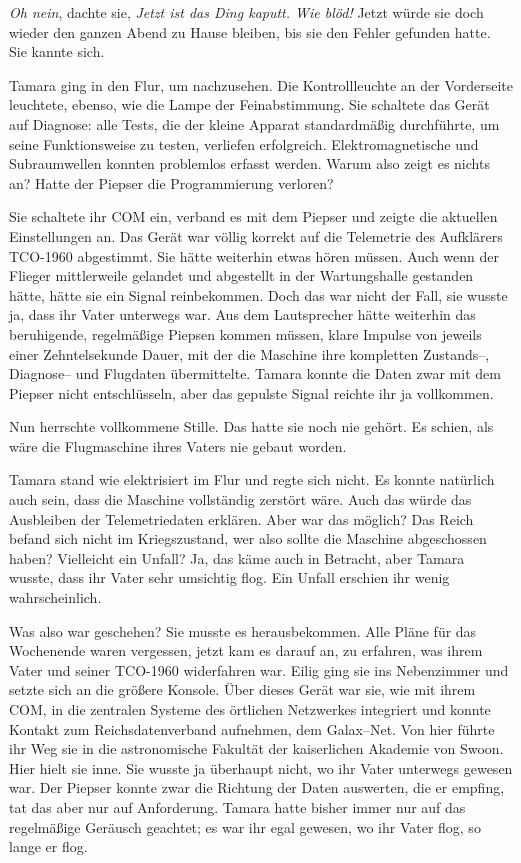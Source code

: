 \documentclass[11pt,twoside,openany]{scrbook}
\begin{document}
\emph{Oh nein}, dachte sie, \emph{Jetzt ist das Ding kaputt. Wie blöd!} Jetzt würde sie doch wieder den ganzen Abend zu Hause bleiben, bis sie den Fehler gefunden hatte. Sie kannte sich. 

Tamara ging in den Flur, um nachzusehen. Die Kontrollleuchte an der Vorderseite leuchtete, ebenso, wie die Lampe der Feinabstimmung. Sie schaltete das Gerät auf Diagnose: alle Tests, die der kleine Apparat standardmäßig durchführte, um seine Funktionsweise zu testen, verliefen erfolgreich. Elektromagnetische und Subraumwellen konnten problemlos erfasst werden. Warum also zeigt es nichts an? Hatte der Piepser die Programmierung verloren?

Sie schaltete ihr COM ein, verband es mit dem Piepser und zeigte die aktuellen Einstellungen an. Das Gerät war völlig korrekt auf die Telemetrie des Aufklärers \textsf{TCO-1960} abgestimmt. Sie hätte weiterhin etwas hören müssen. Auch wenn der Flieger mittlerweile gelandet und abgestellt in der Wartungshalle gestanden hätte, hätte sie ein Signal reinbekommen. Doch das war nicht der Fall, sie wusste ja, dass ihr Vater unterwegs war. Aus dem Lautsprecher hätte weiterhin das beruhigende, regelmäßige Piepsen kommen müssen, klare Impulse von jeweils einer Zehntelsekunde Dauer, mit der die Maschine ihre kompletten Zustands--, Diagnose-- und Flugdaten übermittelte. Tamara konnte die Daten zwar mit dem Piepser nicht entschlüsseln, aber das gepulste Signal reichte ihr ja vollkommen.

Nun herrschte vollkommene Stille. Das hatte sie noch nie gehört. Es schien, als wäre die Flugmaschine ihres Vaters nie gebaut worden.

Tamara stand wie elektrisiert im Flur und regte sich nicht. Es konnte natürlich auch sein, dass die Maschine vollständig zerstört wäre. Auch das würde das  Ausbleiben der Telemetriedaten erklären. Aber war das möglich? Das Reich befand sich nicht im Kriegszustand, wer also sollte die Maschine abgeschossen haben? Vielleicht ein Unfall? Ja, das käme auch in Betracht, aber Tamara wusste, dass ihr Vater sehr umsichtig flog. Ein Unfall erschien ihr wenig wahrscheinlich.

Was also war geschehen? Sie musste es herausbekommen. Alle Pläne für das Wochenende waren vergessen, jetzt kam es darauf an, zu erfahren, was ihrem Vater und seiner \textsf{TCO-1960} widerfahren war. Eilig ging sie ins Nebenzimmer und setzte sich an die größere Konsole. Über dieses Gerät war sie, wie mit ihrem COM, in die zentralen Systeme des örtlichen Netzwerkes integriert und konnte Kontakt zum Reichsdatenverband aufnehmen, dem Galax--Net. Von hier führte ihr Weg sie in die astronomische Fakultät der kaiserlichen Akademie von Swoon. Hier hielt sie inne. Sie wusste ja überhaupt nicht, wo ihr Vater unterwegs gewesen war. Der Piepser konnte zwar die Richtung der Daten auswerten, die er empfing, tat das aber nur auf Anforderung. Tamara hatte bisher immer nur auf das regelmäßige Geräusch geachtet; es war ihr egal gewesen, wo ihr Vater flog, so lange er flog.
\end{document}
